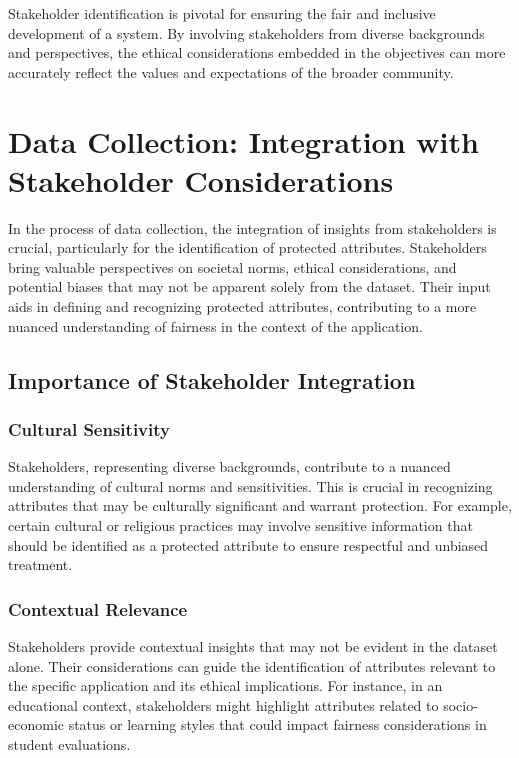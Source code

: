 \documentclass[12pt,a4paper,openright,twoside]{book}
\begin{document}
Stakeholder identification is pivotal for ensuring the fair and inclusive development of a system. By involving stakeholders from diverse backgrounds and perspectives, the ethical considerations embedded in the objectives can more accurately reflect the values and expectations of the broader community.

\section{Data Collection: Integration with Stakeholder Considerations}

In the process of data collection, the integration of insights from stakeholders is crucial, particularly for the identification of protected attributes. Stakeholders bring valuable perspectives on societal norms, ethical considerations, and potential biases that may not be apparent solely from the dataset. Their input aids in defining and recognizing protected attributes, contributing to a more nuanced understanding of fairness in the context of the application.

\subsection{Importance of Stakeholder Integration}

\subsubsection{Cultural Sensitivity}

Stakeholders, representing diverse backgrounds, contribute to a nuanced understanding of cultural norms and sensitivities. This is crucial in recognizing attributes that may be culturally significant and warrant protection. For example, certain cultural or religious practices may involve sensitive information that should be identified as a protected attribute to ensure respectful and unbiased treatment.

\subsubsection{Contextual Relevance}

Stakeholders provide contextual insights that may not be evident in the dataset alone. Their considerations can guide the identification of attributes relevant to the specific application and its ethical implications. For instance, in an educational context, stakeholders might highlight attributes related to socio-economic status or learning styles that could impact fairness considerations in student evaluations.
\end{document}
